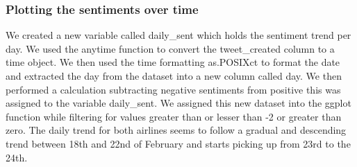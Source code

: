 \documentclass[
]{article}
\newenvironment{Shaded}{\begin{snugshade}}{\end{snugshade}}
\newcommand{\CommentTok}[1]{\textcolor[rgb]{0.56,0.35,0.01}{\textit{#1}}}
\newcommand{\DataTypeTok}[1]{\textcolor[rgb]{0.13,0.29,0.53}{#1}}
\newcommand{\KeywordTok}[1]{\textcolor[rgb]{0.13,0.29,0.53}{\textbf{#1}}}
\newcommand{\NormalTok}[1]{#1}
\newcommand{\OperatorTok}[1]{\textcolor[rgb]{0.81,0.36,0.00}{\textbf{#1}}}
\newcommand{\StringTok}[1]{\textcolor[rgb]{0.31,0.60,0.02}{#1}}
\begin{document}
\hypertarget{plotting-the-sentiments-over-time}{%
\subsubsection{Plotting the sentiments over
time}\label{plotting-the-sentiments-over-time}}

We created a new variable called daily\_sent which holds the sentiment
trend per day. We used the anytime function to convert the
tweet\_created column to a time object. We then used the time formatting
as.POSIXct to format the date and extracted the day from the dataset
into a new column called day. We then performed a calculation
subtracting negative sentiments from positive this was assigned to the
variable daily\_sent. We assigned this new dataset into the ggplot
function while filtering for values greater than or lesser than -2 or
greater than zero. The daily trend for both airlines seems to follow a
gradual and descending trend between 18th and 22nd of February and
starts picking up from 23rd to the 24th.

\begin{Shaded}
\end{Shaded}
\end{document}
